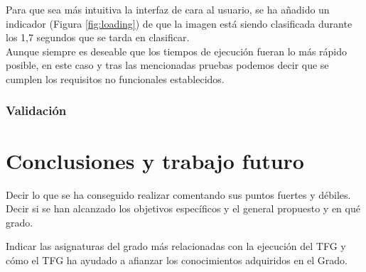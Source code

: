 \documentclass[a4paper,11pt]{book}
\begin{document}
Para que sea más intuitiva la interfaz de cara al usuario, se ha añadido un indicador (Figura \ref{fig:loading}) de que la imagen está siendo clasificada durante los 1,7 segundos que se tarda en clasificar.\\
Aunque siempre es deseable que los tiempos de ejecución fueran lo más rápido posible, en este caso y tras las mencionadas pruebas podemos decir que se cumplen los requisitos no funcionales establecidos.\\








\subsection{Validación}

\chapter{Conclusiones y trabajo futuro}

Decir lo que se ha conseguido realizar comentando sus puntos fuertes y débiles.
Decir si se han alcanzado los objetivos específicos y el general propuesto y en qué grado.

Indicar las asignaturas del grado más relacionadas con la ejecución del TFG y cómo el TFG ha ayudado a afianzar los conocimientos adquiridos en el Grado.
\end{document}
